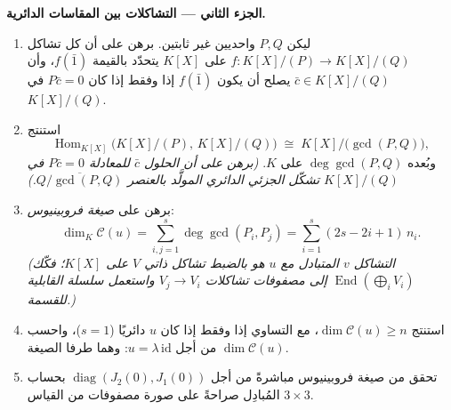 \begin{problem}
\medskip
\noindent\textbf{الجزء الثاني --- التشاكلات بين المقاسات
الدائرية.}
\begin{enumerate}[resume]
  \item ليكن $P, Q$ واحديين غير ثابتين. برهن على أن كل تشاكل
        $f \colon K[X]/(P) \to K[X]/(Q)$ على $K[X]$ يتحدّد بالقيمة $f(\bar 1)$، وأن
        $\bar c \in K[X]/(Q)$ يصلح أن يكون $f(\bar 1)$ إذا وفقط إذا كان
        $P\bar c = 0$ في $K[X]/(Q)$.
  \item استنتج
        \[
        \operatorname{Hom}_{K[X]}\bigl(K[X]/(P),\, K[X]/(Q)\bigr)
        \;\cong\; K[X]\big/\bigl(\gcd(P, Q)\bigr),
        \]
        وبُعده $\deg \gcd(P, Q)$ على $K$. \emph{(برهن على أن الحلول $\bar c$ للمعادلة
        $P\bar c = 0$ في $K[X]/(Q)$ تشكّل  الجزئي الدائري
        المولَّد بالعنصر $\overline{Q/\gcd(P,Q)}$.)}
  \item برهن على \emph{صيغة فروبينيوس}:
        \[
        \dim_K \mathcal C(u) = \sum_{i,j=1}^{s} \deg\gcd(P_i,
        P_j) = \sum_{i=1}^{s} (2s - 2i + 1)\, n_i .
        \]
        \emph{(التشاكل $v$ المتبادل مع $u$ هو بالضبط تشاكل ذاتي
         $V$ على $K[X]$؛ فكّك $\operatorname{End}(\bigoplus_i V_i)$ إلى مصفوفات تشاكلات
        $V_j \to V_i$ واستعمل سلسلة القابلية للقسمة.)}
  \item استنتج $\dim \mathcal C(u) \geq n$، مع التساوي إذا وفقط إذا كان $u$ دائريًا
        ($s = 1$)، واحسب $\dim\mathcal C(u)$ من أجل $u = \lambda\,\mathrm{id}$: وهما طرفا
        الصيغة.
  \item تحقق من صيغة فروبينيوس مباشرةً من أجل $\operatorname{diag}(J_2(0), J_1(0))$ بحساب
        المُبادِل صراحةً على صورة مصفوفات من القياس $3\times3$.
\end{enumerate}


\end{problem}
